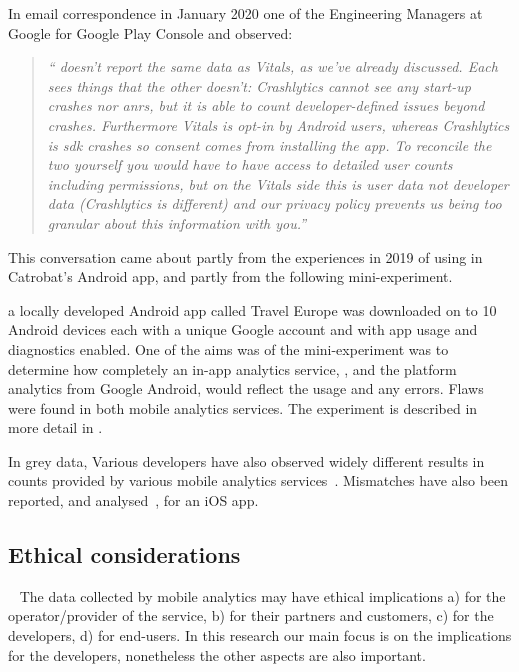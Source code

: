 In email correspondence in January 2020 one of the Engineering Managers at Google for Google Play Console and  observed:

\begin{quote}
    \emph{`` doesn't report the same data as Vitals, as we've already discussed. Each sees things that the other doesn't: Crashlytics cannot see any start-up crashes nor \Glspl{anr}, but it is able to count developer-defined issues beyond crashes. Furthermore Vitals is opt-in by Android users, whereas Crashlytics is \Gls{sdk} crashes so consent comes from installing the app. To reconcile the two yourself you would have to have access to detailed user counts including permissions, but on the Vitals side this is user data not developer data (Crashlytics is different) and our privacy policy prevents us being too granular about this information with you.''}
\end{quote}

This conversation came about partly from the experiences in 2019 of using  in Catrobat's  Android app, and partly from the following mini-experiment. 

a locally developed Android app called Travel Europe was downloaded on to 10 Android devices each with a unique Google account and with app usage and diagnostics enabled. One of the aims was of the mini-experiment was to determine how completely an in-app analytics service, , and the platform analytics from Google Android, would reflect the usage and any errors. Flaws were found in both mobile analytics services. The experiment is described in more detail in .

In grey data, Various developers have also observed widely different results in counts provided by various mobile analytics services~. Mismatches have also been reported, and analysed~, for an iOS app. %


\subsection{Ethical considerations}~\label{tata-ethical-considerations-topic}
The data collected by mobile analytics may have ethical implications a) for the operator/provider of the service, b) for their partners and customers, c) for the developers, d) for end-users. In this research our main focus is on the implications for the developers, nonetheless the other aspects are also important.

